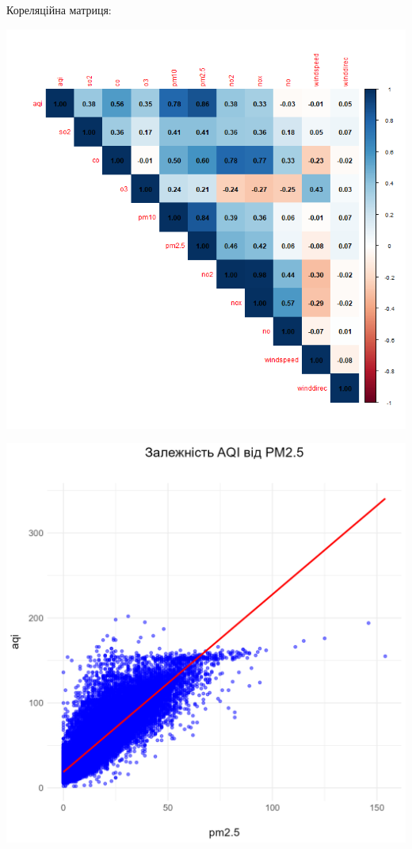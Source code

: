 \documentclass[./report.tex]{subfiles}
\begin{document}
\begin{enumerate}
  Кореляційна матриця:

  \includegraphics[width=6in]{plots/question1/corr_matrix_plot.png}

  \includegraphics[width=6in]{plots/question1/aqi_pm2_5_diagram.png}


\end{enumerate}
\end{document}

